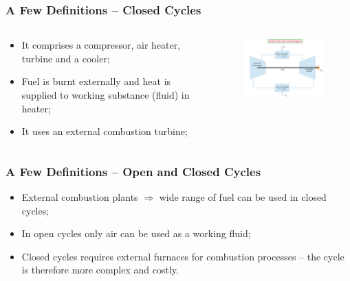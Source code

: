 \documentclass[10pt,compress]{beamer}
\begin{document}
\begin{frame}
 \frametitle{A Few Definitions -- Closed Cycles}
 \begin{columns}
  \begin{column}[c]{0.4\linewidth}
   \begin{itemize}
    \item <1-> It comprises a compressor, air heater, turbine and a cooler;
    \item <2-> Fuel is burnt externally and heat is supplied to working substance (fluid) in heater;
    \item <3-> It uses an external combustion turbine;
   \end{itemize}
  \end{column}
  \begin{column}[c]{0.6\linewidth}
   \begin{figure}%
    \begin{center}
     \includegraphics[width=7.5cm,clip]{./Pics/Closed_Gas_Turbine_Engines}
    \end{center}
   \end{figure}  
  \end{column}  
 \end{columns}

 \normalsize

\end{frame}


\begin{frame}
 \frametitle{A Few Definitions -- Open and Closed Cycles}
   \begin{itemize}
    \item <1-> External combustion plants $\Longrightarrow$ wide range of fuel can be used in closed cycles; 
    \item <2-> In open cycles only air can be used as a working fluid;
    \item <3-> Closed cycles requires external furnaces for combustion processes -- the cycle is therefore more complex and costly.
   \end{itemize}

 \normalsize

\end{frame}
\end{document}
